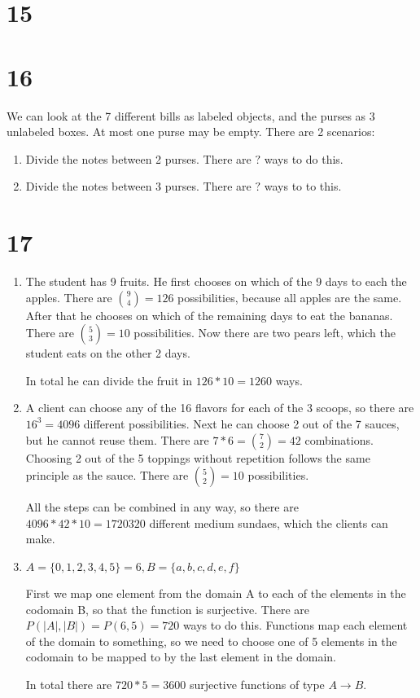 \documentclass[12pt]{article}
\begin{document}
\section*{15}

\section*{16}
We can look at the 7 different bills as labeled objects, and the purses as 3 unlabeled boxes. At most one purse may be empty. There are 2 scenarios:

\begin{enumerate}
	\item
	Divide the notes between 2 purses. There are $?$ ways to do this.
	\item
	Divide the notes between 3 purses. There are $?$ ways to to this.
\end{enumerate}

\section*{17}
\begin{enumerate}[a]
	\item %
	The student has 9 fruits. He first chooses on which of the 9 days to each the apples. There are $\binom{9}{4} = 126$ possibilities, because all apples are the same. After that he chooses on which of the remaining days to eat the bananas. There are $\binom{5}{3} = 10$ possibilities. Now there are two pears left, which the student eats on the other 2 days.

	In total he can divide the fruit in $126 * 10 = 1260$ ways.
	\item %
	A client can choose any of the 16 flavors for each of the 3 scoops, so there are $16^3 = 4096$ different possibilities. Next he can choose 2 out of the 7 sauces, but he cannot reuse them. There are $7 * 6 = \binom{7}{2} = 42$ combinations. Choosing 2 out of the 5 toppings without repetition follows the same principle as the sauce. There are $\binom{5}{2} = 10$ possibilities.

	All the steps can be combined in any way, so there are $4096 * 42 * 10 = 1720320$ different medium sundaes, which the clients can make.
	\item %
	$A = \{0, 1, 2, 3, 4, 5\} = 6, B = \{a, b, c, d, e, f\}$

	First we map one element from the domain A to each of the elements in the codomain B, so that the function is surjective. There are $P(|A|, |B|) =  P(6,5) = 720$ ways to do this. Functions map each element of the domain to something, so we need to choose one of 5 elements in the codomain to be mapped to by the last element in the domain.

	In total there are $720 * 5 = 3600$ surjective functions of type $A \rightarrow B$.
\end{enumerate}
\end{document}

